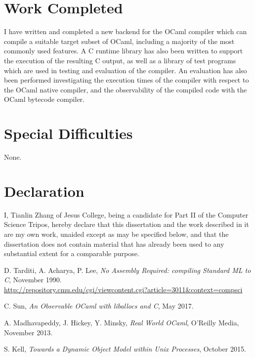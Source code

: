 \documentclass[12pt,a4paper,twoside,openright]{report}
\begin{document}
\section*{Work Completed}

I have written and completed a new backend for the OCaml compiler which can
compile a suitable target subset of OCaml, including a majority of the most
commonly used features. A C runtime library has also been written to support the
execution of the resulting C output, as well as a library of test programs which
are used in testing and evaluation of the compiler. An evaluation has also been
performed investigating the execution times of the compiler with respect to the
OCaml native compiler, and the observability of the compiled code with the OCaml
bytecode compiler.

\section*{Special Difficulties}

None.
 
\newpage
\section*{Declaration}

I, Tianlin Zhang of Jesus College, being a candidate for Part II of the Computer
Science Tripos, hereby declare
that this dissertation and the work described in it are my own work,
unaided except as may be specified below, and that the dissertation
does not contain material that has already been used to any substantial
extent for a comparable purpose.

\bigskip
{}

\medskip
{}

\tableofcontents


\pagestyle{headings}




\begin{thebibliography}{9}

D. Tarditi, A. Acharya, P. Lee,
\textit{No Assembly Required: compiling Standard ML to C},
November 1990.\\
\url{http://repository.cmu.edu/cgi/viewcontent.cgi?article=3011&context=compsci}

C. Sun,
\textit{An Observable OCaml with liballocs and C},
May 2017.

A. Madhavapeddy, J. Hickey, Y. Minsky,
\textit{Real World OCaml},
O'Reilly Media,
November 2013.

S. Kell,
\textit{Towards a Dynamic Object Model within Unix Processes},
October 2015.

\end{thebibliography}


\end{document}
